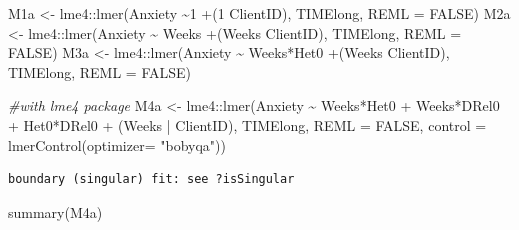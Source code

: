 \documentclass[
  11pt,
]{book}
\newenvironment{Shaded}{\begin{snugshade}}{\end{snugshade}}
\newcommand{\AttributeTok}[1]{\textcolor[rgb]{0.77,0.63,0.00}{#1}}
\newcommand{\CommentTok}[1]{\textcolor[rgb]{0.56,0.35,0.01}{\textit{#1}}}
\newcommand{\ConstantTok}[1]{\textcolor[rgb]{0.00,0.00,0.00}{#1}}
\newcommand{\FunctionTok}[1]{\textcolor[rgb]{0.00,0.00,0.00}{#1}}
\newcommand{\NormalTok}[1]{#1}
\newcommand{\OtherTok}[1]{\textcolor[rgb]{0.56,0.35,0.01}{#1}}
\newcommand{\SpecialCharTok}[1]{\textcolor[rgb]{0.00,0.00,0.00}{#1}}
\newcommand{\StringTok}[1]{\textcolor[rgb]{0.31,0.60,0.02}{#1}}
\begin{document}
M1a \textless- lme4::lmer(Anxiety \textasciitilde1 +(1 \textbar{} ClientID), TIMElong, REML = FALSE)
M2a \textless- lme4::lmer(Anxiety \textasciitilde{} Weeks +(Weeks \textbar{} ClientID), TIMElong, REML = FALSE)
M3a \textless- lme4::lmer(Anxiety \textasciitilde{} Weeks*Het0 +(Weeks \textbar{} ClientID), TIMElong, REML = FALSE)

\begin{Shaded}
\begin{Highlighting}[]
\CommentTok{\#with lme4 package}
\NormalTok{M4a }\OtherTok{\textless{}{-}}\NormalTok{ lme4}\SpecialCharTok{::}\FunctionTok{lmer}\NormalTok{(Anxiety }\SpecialCharTok{\textasciitilde{}}\NormalTok{ Weeks}\SpecialCharTok{*}\NormalTok{Het0 }\SpecialCharTok{+}\NormalTok{ Weeks}\SpecialCharTok{*}\NormalTok{DRel0 }\SpecialCharTok{+}\NormalTok{ Het0}\SpecialCharTok{*}\NormalTok{DRel0 }\SpecialCharTok{+}\NormalTok{ (Weeks }\SpecialCharTok{|}\NormalTok{ ClientID), TIMElong, }\AttributeTok{REML =} \ConstantTok{FALSE}\NormalTok{, }\AttributeTok{control =} \FunctionTok{lmerControl}\NormalTok{(}\AttributeTok{optimizer=} \StringTok{"bobyqa"}\NormalTok{))}
\end{Highlighting}
\end{Shaded}

\begin{verbatim}
boundary (singular) fit: see ?isSingular
\end{verbatim}

\begin{Shaded}
\begin{Highlighting}[]
\FunctionTok{summary}\NormalTok{(M4a)}
\end{Highlighting}
\end{Shaded}
\end{document}
